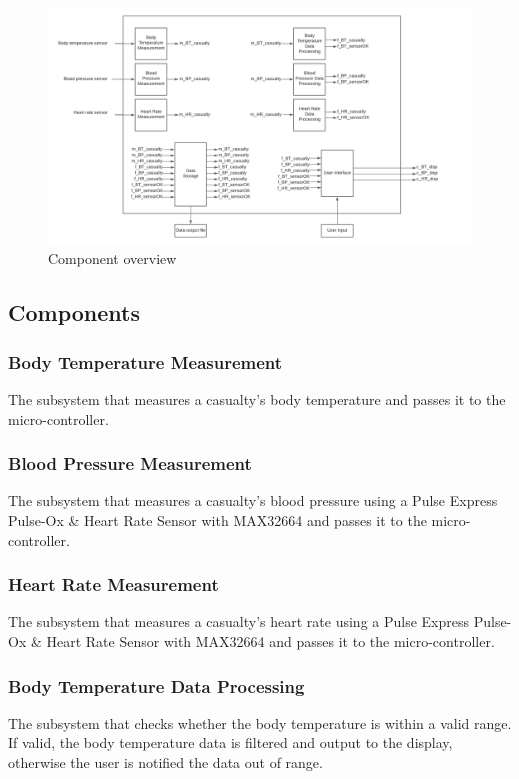 \documentclass{article}
\begin{document}
    \begin{figure}[!htb]
    	\centering
    	\includegraphics[width=1\linewidth]{f functions.png}
    	\caption{Component overview}
    \end{figure}
    
    \subsection{Components}
    \subsubsection{Body Temperature Measurement}
    The subsystem that measures a casualty's body temperature and passes it to the micro-controller. 
    \subsubsection{Blood Pressure Measurement}
    The subsystem that measures a casualty's blood pressure using a Pulse Express Pulse-Ox \& Heart Rate Sensor with MAX32664 and passes it to the micro-controller.
    \subsubsection{Heart Rate Measurement}
    The subsystem that measures a casualty's heart rate using a Pulse Express Pulse-Ox \& Heart Rate Sensor with MAX32664 and passes it to the micro-controller.
    \subsubsection{Body Temperature Data Processing}
    The subsystem that checks whether the body temperature is within a valid range.  If valid, the body temperature data is filtered and output to the display, otherwise the user is notified the data out of range. 
\end{document}
